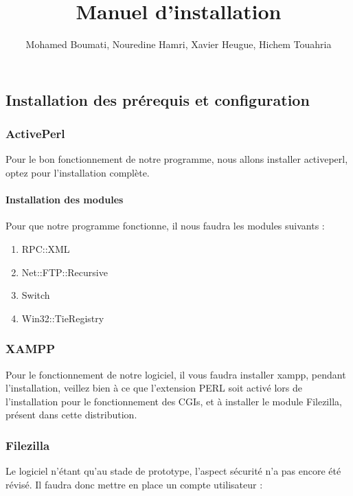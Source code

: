 \documentclass[10pt,a4paper]{report}
\author{Mohamed Boumati, Nouredine Hamri, Xavier Heugue, Hichem Touahria}
\title{Manuel d'installation}
\begin{document}
\maketitle
\chapter{}
\section{Installation des prérequis et configuration}

\subsection{ActivePerl}

Pour le bon fonctionnement de notre programme, nous allons installer activeperl, optez pour l'installation complète.

\subsubsection{Installation des modules}

Pour que notre programme fonctionne, il nous faudra les modules suivants :
\begin{enumerate}
\item RPC::XML
\item Net::FTP::Recursive
\item Switch
\item Win32::TieRegistry
\end{enumerate}

\subsection{XAMPP}

Pour le fonctionnement de notre logiciel, il vous faudra installer xampp, pendant l'installation, veillez bien à ce que l'extension PERL soit activé lors de l'installation pour le fonctionnement des CGIs, et à installer le module Filezilla, présent dans cette distribution.

\subsection{Filezilla}

Le logiciel n'étant qu'au stade de prototype, l'aspect sécurité n'a pas encore été révisé. Il faudra donc mettre en place un compte utilisateur :
\end{document}
